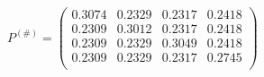 \documentclass{standalone}
\begin{document}
	$P^{(\#)} =
	\begin{pmatrix}
		0.3074 & 0.2329 & 0.2317 & 0.2418  \\
		0.2309 & 0.3012 & 0.2317 & 0.2418 \\
		0.2309 & 0.2329 & 0.3049 & 0.2418 \\
		0.2309 & 0.2329 & 0.2317 & 0.2745 \\
	\end{pmatrix}$
\end{document}
